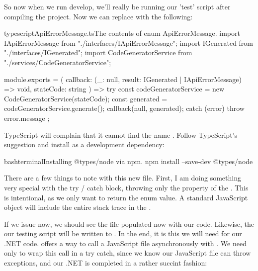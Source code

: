 \documentclass[paper=6in:9in,pagesize=pdftex,headinclude=on,footinclude=on,12pt,twoside]{scrbook}
\begin{document}
So now when we run develop, we'll really be running our 'test' script after compiling the project. Now we can replace  with the following:

\begin{codeInput}{typescript}{ApiErrorMessage.ts}{The contents of enum ApiErrorMessage.}
import IApiErrorMessage from "./interfaces/IApiErrorMessage";
import IGenerated from "./interfaces/IGenerated";
import CodeGeneratorService from "./services/CodeGeneratorService";

module.exports = (
  callback: (_: null, result: IGenerated | IApiErrorMessage) => void,
  stateCode: string
) => {
  try {
    const codeGeneratorService = new CodeGeneratorService(stateCode);
    const generated = codeGeneratorService.generate();
    callback(null, generated);
  } catch (error) {
    throw error.message
  }
};  
\end{codeInput}

TypeScript will complain that it cannot find the name . Follow TypeScript's suggestion and install  as a development dependency:

\begin{codeInput}{bash}{terminal}{Installing @types/node via npm.}
npm install --save-dev @types/node
\end{codeInput}

There are a few things to note with this new  file. First, I am doing something very special with the try / catch block, throwing only the  property of the . This is intentional, as we only want to return the  enum value. A standard JavaScript  object will include the entire stack trace in the .

If we issue  now, we should see the  file populated now with our  code. Likewise, the our testing script will be written to . In the end, it is this  we will need for our .NET code.  offers a way to call a JavaScript file asynchronously with . We need only to wrap this call in a try catch, since we know our JavaScript file can throw exceptions, and our .NET  is completed in a rather succint fashion:
\end{document}

